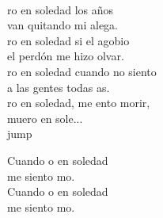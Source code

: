 \begin{cancion}
\begin{chorus}
	\end{chorus}%
	\jump\\
	ro en soledad los años  \\
	van quitando mi alega.\\
	ro en soledad si el agobio \\
	el perdón me hizo olvar.\\
	ro en soledad cuando no siento\\
	a las gentes todas as.\\
	ro en soledad, me ento morir, \\
	muero en sole...\\jump\\
	\begin{chorus}%
	Cuando o en soledad \\
	me siento mo.\\
	Cuando o en soledad \\
	me siento mo. \\
	\end{chorus}%
	\jump\\
\end{cancion}%
